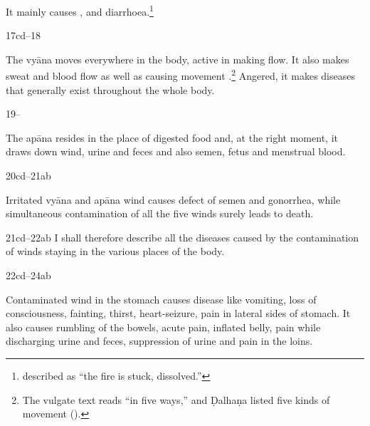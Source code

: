 \begin{translation}
It mainly causes ,  and diarrhoea.\footnote{ described 
 as “the fire is stuck, dissolved.”}



\item[17cd--18] 

The vyāna moves everywhere in the body, active in making
 flow.   It also makes sweat and blood flow as well as
causing movement .\footnote{The vulgate text
    reads  “in five ways,” and Ḍalhaṇa listed five kinds of
    movement ().} Angered, it  makes diseases that
    generally exist throughout the whole body.
    
    \item [19--]
    
The apāna resides in the place of digested food and, at the right moment, it 
draws down wind, urine and feces and also semen, fetus and menstrual blood. 



%

\item[20cd--21ab]

Irritated vyāna and apāna wind causes defect of semen and gonorrhea,
while simultaneous contamination of all the five winds surely leads
to death.


\item[21cd--22ab] I shall therefore describe all the diseases caused by the 
contamination of winds staying in the various places of the body.

\item[22cd--24ab] 

Contaminated wind in the stomach causes disease like
vomiting, loss of consciousness, fainting, thirst, heart-seizure, pain in
lateral sides of stomach. It also causes rumbling of the bowels, acute
pain, inflated belly, pain while discharging urine and feces, suppression
of urine and pain in the loins.


\end{translation}
